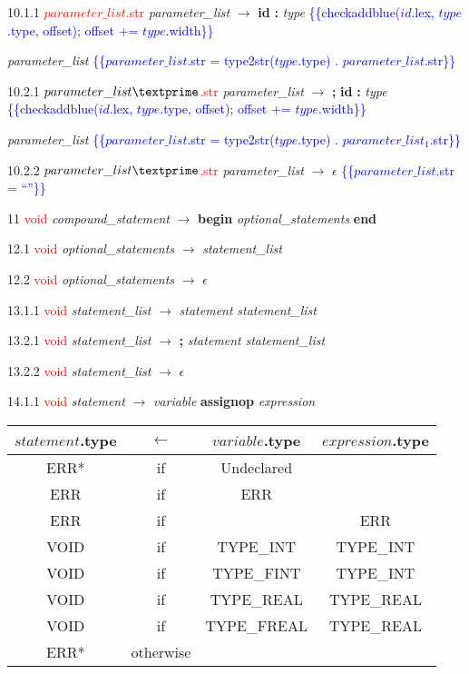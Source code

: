 \documentclass[10pt]{article}
\begin{document}
10.1.1 \textcolor{red}{$parameter\_list$.str} \emph{parameter\_list} $\rightarrow$ \textbf{id} \textbf{:} \emph{type} \textcolor{blue}{\{\{checkaddblue($id$.lex, $type$.type, offset); offset += $type$.width\}\}}

\emph{parameter\_list\textprime} \textcolor{blue}{\{\{$parameter\_list$.str = type2str($type$.type) . $parameter\_list$\textprime.str\}\}}

10.2.1 \textcolor{red}{$parameter\_list\textprime$.str} \emph{parameter\_list\textprime} $\rightarrow$ \textbf{;} \textbf{id} \textbf{:} \emph{type} \textcolor{blue}{\{\{checkaddblue($id$.lex, $type$.type, offset); offset += $type$.width\}\}}

\emph{parameter\_list\textprime} \textcolor{blue}{\{\{$parameter\_list$\textprime.str = type2str($type$.type) . $parameter\_list_1$\textprime.str\}\}}


10.2.2 \textcolor{red}{$parameter\_list\textprime$.str} \emph{parameter\_list\textprime} $\rightarrow$ $\epsilon$ \textcolor{blue}{\{\{$parameter\_list$\textprime.str = ``''\}\}}

11   \textcolor{red}{void} \emph{compound\_statement} $\rightarrow$ \textbf{begin} \emph{optional\_statements} \textbf{end}

12.1 \textcolor{red}{void} \emph{optional\_statements} $\rightarrow$ \emph{statement\_list}

12.2 \textcolor{red}{void} \emph{optional\_statements} $\rightarrow$ $\epsilon$

13.1.1 \textcolor{red}{void} \emph{statement\_list} $\rightarrow$ \emph{statement} \emph{statement\_list\textprime}

13.2.1 \textcolor{red}{void} \emph{statement\_list\textprime} $\rightarrow$ \textbf{;} \emph{statement} \emph{statement\_list\textprime}

13.2.2 \textcolor{red}{void} \emph{statement\_list\textprime} $\rightarrow$ $\epsilon$

14.1.1 \textcolor{red}{void} \emph{statement} $\rightarrow$ \emph{variable} \textbf{assignop} \emph{expression}

\begin{tabular}[t]{|c|c|c|c|}
  \hline

  $statement$.type & \textbf{$\leftarrow$} & $variable$.type & $expression$.type \\

  \hline

  ERR* & if & Undeclared &  \\
  ERR & if & ERR & \\
  ERR & if & & ERR \\
  VOID & if & TYPE_INT & TYPE_INT \\
  VOID & if & TYPE_FINT & TYPE_INT \\
  VOID & if & TYPE_REAL & TYPE_REAL \\
  VOID & if & TYPE_FREAL & TYPE_REAL \\
  ERR* & otherwise &  &  \\
  \hline

\end{tabular}
\end{document}
